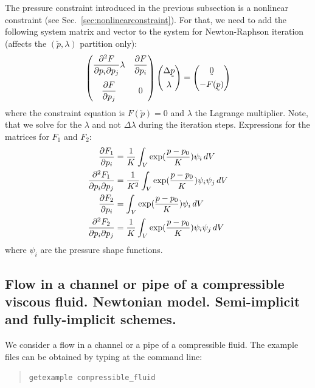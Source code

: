The pressure constraint introduced in the previous subsection is a nonlinear constraint (see Sec.~\ref{sec:nonlinearconstraint}). For that, we need to add the following system matrix and vector to the system for Newton-Raphson iteration (affects the $(\utilde p,\lambda)$ partition only):
\begin{equation*}
   \begin{pmatrix}
      \pderivxy{^2F}{p_i}{p_j}\lambda &
   \pderiv{F}{p_i} \\[3ex]
   \pderiv{F}{p_j} & 0
   \end{pmatrix}
     \begin{pmatrix}
            \Delta \utilde p\\[1ex]
            \lambda
     \end{pmatrix}
   = 
     \begin{pmatrix}
            \utilde 0 \\[1ex]
            -F(\utilde p)
     \end{pmatrix}
\end{equation*}
where the constraint equation is $F(\utilde p)=0$ and $\lambda$ the Lagrange multiplier. Note, that we solve for the $\lambda$ and not $\Delta\lambda$ during the iteration steps. Expressions for the matrices for $F_1$ and $F_2$:
\begin{align*}
   \dfrac{\partial F_1}{\partial p_i}&=\frac1K\int_V \exp(\frac{p-p_0}{K})\psi_i\,dV\\
   \dfrac{\partial ^2F_1}{\partial p_i \partial p_j}&=\frac1{K^2}\int_V \exp(\frac{p-p_0}{K})\psi_i\psi_j\,dV\\
   \dfrac{\partial F_2}{\partial p_i}&=\int_V \exp(\frac{p-p_0}{K})\psi_i\,dV\\
   \dfrac{\partial ^2F_2}{\partial p_i \partial p_j}&=\frac1{K}\int_V \exp(\frac{p-p_0}{K})\psi_i\psi_j\,dV
\end{align*}
where $\psi_i$ are the pressure shape functions.

\subsection{Flow in a channel or pipe of a compressible viscous fluid.
Newtonian model. Semi-implicit and fully-implicit schemes.}

We consider a flow in a channel or a pipe of a compressible fluid.
The example files can be obtained by typing at the
command line:
\begin{quote}
   \texttt{getexample compressible\_fluid}
\end{quote}

